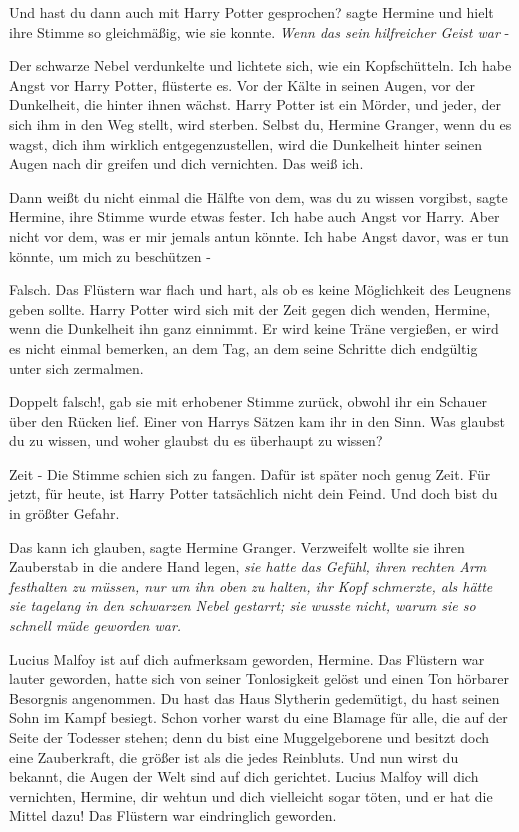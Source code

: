 \glqq{}Und hast du dann auch mit Harry Potter gesprochen?\grqq{} sagte Hermine
und hielt ihre Stimme so gleichmäßig, wie sie konnte. \emph{Wenn das sein
hilfreicher Geist war} -

Der schwarze Nebel verdunkelte und lichtete sich, wie ein Kopfschütteln. \glqq{}
Ich habe Angst vor Harry Potter\grqq{}, flüsterte es. \glqq{}Vor der Kälte in
seinen Augen, vor der Dunkelheit, die hinter ihnen wächst. Harry Potter ist ein
Mörder, und jeder, der sich ihm in den Weg stellt, wird sterben. Selbst du,
Hermine Granger, wenn du es wagst, dich ihm wirklich entgegenzustellen, wird die
Dunkelheit hinter seinen Augen nach dir greifen und dich vernichten. Das weiß
ich.\grqq{}

\glqq{}Dann weißt du nicht einmal die Hälfte von dem, was du zu wissen
vorgibst\grqq{}, sagte Hermine, ihre Stimme wurde etwas fester. \glqq{}Ich habe
auch Angst vor Harry. Aber nicht vor dem, was er mir jemals antun könnte. Ich
habe Angst davor, was er tun könnte, um mich zu beschützen -\grqq{}

\glqq{}Falsch.\grqq{} Das Flüstern war flach und hart, als ob es keine
Möglichkeit des Leugnens geben sollte. \glqq{}Harry Potter wird sich mit der Zeit
gegen dich wenden, Hermine, wenn die Dunkelheit ihn ganz einnimmt. Er wird keine
Träne vergießen, er wird es nicht einmal bemerken, an dem Tag, an dem seine
Schritte dich endgültig unter sich zermalmen.\grqq{}

\glqq{}Doppelt falsch!\grqq{}, gab sie mit erhobener Stimme zurück, obwohl ihr
ein Schauer über den Rücken lief. Einer von Harrys Sätzen kam ihr in den Sinn.
\glqq{}Was glaubst du zu wissen, und woher glaubst du es überhaupt zu
wissen?\grqq{}

\glqq{}Zeit -\grqq{} Die Stimme schien sich zu fangen. \glqq{}Dafür ist später
noch genug Zeit. Für jetzt, für heute, ist Harry Potter tatsächlich nicht dein
Feind. Und doch bist du in größter Gefahr.\grqq{}

\glqq{}Das kann ich glauben\grqq{}, sagte Hermine Granger. Verzweifelt wollte sie
ihren Zauberstab in die andere Hand legen,\emph{ sie hatte das Gefühl, ihren
rechten Arm festhalten zu müssen, nur um ihn oben zu halten, ihr Kopf schmerzte,
als hätte sie tagelang in den schwarzen Nebel gestarrt; sie wusste nicht, warum
sie so schnell müde geworden war.}

\glqq{}Lucius Malfoy ist auf dich aufmerksam geworden, Hermine.\grqq{} Das
Flüstern war lauter geworden, hatte sich von seiner Tonlosigkeit gelöst und
einen Ton hörbarer Besorgnis angenommen. \glqq{}Du hast das Haus Slytherin
gedemütigt, du hast seinen Sohn im Kampf besiegt. Schon vorher warst du eine
Blamage für alle, die auf der Seite der Todesser stehen; denn du bist eine
Muggelgeborene und besitzt doch eine Zauberkraft, die größer ist als die jedes
Reinbluts. Und nun wirst du bekannt, die Augen der Welt sind auf dich gerichtet.
Lucius Malfoy will dich vernichten, Hermine, dir wehtun und dich vielleicht
sogar töten, und er hat die Mittel dazu!\grqq{} Das Flüstern war eindringlich
geworden.

